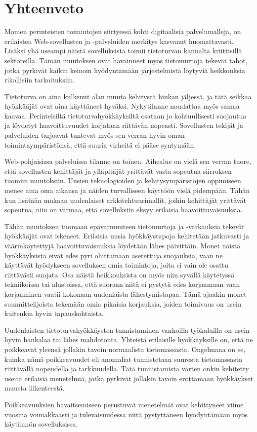 
\chapter{Yhteenveto}

Monien perinteisten toimintojen siirtyessä kohti digitaalisia palvelumalleja, on erilaisten 
Web-sovellusten ja -palveluiden merkitys kasvanut huomattavasti. Lisäksi yhä useampi näistä sovelluksista
toimii tietoturvan kannalta kriittisillä sektoreilla.
Tämän muutoksen ovat havainneet myös tietomurtoja tekevät tahot, jotka pyrkivät kaikin
keinoin hyödyntämään järjestelmistä löytyviä heikkouksia rikollisiin tarkoituksiin.

Tietoturva on aina kulkenut alan muuta kehitystä hiukan jäljessä, ja tätä seikkaa hyökkääjät
ovat aina käyttäneet hyväksi. Nykytilanne noudattaa myös samaa kaavaa. Perinteisiltä
tietoturvahyökkäyksiltä osataan jo kohtuullisesti suojautua ja löydetyt haavoittuvuudet
korjataan riittävän nopeasti. Sovellusten tekijät ja palveluiden tarjoavat tuntevat
myös sen verran hyvin oman toimintaympäristönsä, että suuria virheitä ei pääse syntymään.

Web-pohjaisissa palveluissa tilanne on toinen. Aihealue on vielä sen verran tuore, että sovellusten kehittäjät ja ylläpitäjät yrittävät vasta sopeutua siirroksen tuomiin muutoksiin. Uusien teknologioiden ja kehitysympäristöjen oppimiseen menee aina oma aikansa ja näiden turvalliseen käyttöön vielä pidempään.  Tähän kun lisätään mukaan uudenlaiset arkkitehtuurimallit, joihin kehittäjät yrittävät sopeutua, niin on varmaa, että sovelluksiin eksyy erilaisia haavoittuvaisuuksia.

Tähän muutoksen tuomaan epävarmuuteen tietomurtoja ja -varkauksia tekevät hyökkääjät ovat iskeneet. 
Erilaisia uusia hyökkäystapoja kehitetään jatkuvasti ja väärinkäytettyjä haavoittuvaisuuksia löydetään lähes päivittäin.
Monet näistä hyökkäyksistä eivät edes pyri ohittamaan asetettuja suojauksia, vaan ne käyttävät hyödykseen
sovelluksen omia toimintoja, joita ei vain ole osattu riittävästi suojata. Osa näistä heikkouksista on 
myös niin syvällä käytetyssä tekniikoissa tai alustoissa, että suoraan niitä ei pystytä edes korjaamaan vaan
korjaaminen vaatii kokonaan uudenlaista lähestymistapaa. Tämä ajaakin monet suunnittelijoista tekemään
omia pikaisia korjauksia, joiden toimivuus on usein kuitenkin hyvin tapauskohtaista. 

Uudenlaisten tietoturvahyökkäysten tunnistaminen vanhoilla työkaluilla on usein hyvin hankalaa tai
lähes mahdotonta. Yhteistä erilaisille hyökkäyksille on, että ne poikkeavat yleensä jollakin tavoin normaalista
tietomassasta. Ongelmana on se, kuinka nämä poikkeavuudet eli anomaliat tunnistetaan suuresta tietomassasta
riittävällä nopeudella ja tarkkuudella. Tätä tunnistamista varten onkin kehitetty useita erilaisia menetelmiä,
jotka pyrkivät jollakin tavoin erottamaan hyökkäykset muusta liikenteestä. 

Poikkeavuuksien havaitsemiseen perustuvat menetelmät ovat kehittyneet viime vuosina voimakkaasti ja tulevaisuudessa niitä pystyttäneen hyödyntämään myös käytännön sovelluksissa.


